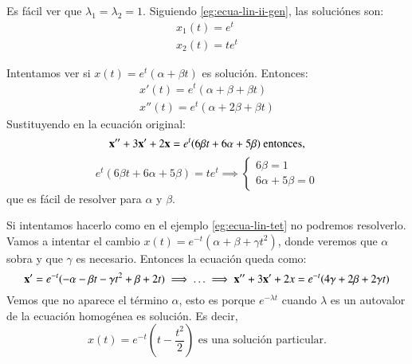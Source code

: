 \begin{eg}[Ecuación lineal de orden 2: $ \mbf{x}'' + 2\mbf{x}' + \mbf{x} = 0 $]
    Es fácil ver que $\lambda_1 = \lambda_2 = 1$. Siguiendo \ref{eg:ecua-lin-ii-gen}, las soluciónes son:
    \begin{gather*}
        x_1(t) = e^{ t} \\ x_2(t) = t e^{t}
    \end{gather*}
\end{eg}

\begin{eg}[Ecuación lineal de orden 2: $\mbf{x}''+3\mbf{x}'+2\mbf{x}=te^t$ ]\label{eg:ecua-lin-tet} %
    Intentamos ver si $x(t) = e^t(\alpha + \beta t)$ es solución. Entonces:
    \begin{gather*}
        x'(t) = e^{ t}(\alpha + \beta + \beta t) \\ x''(t) = e^t (\alpha + 2\beta + \beta t)
    \end{gather*}
    Sustituyendo en la ecuación original:
    $$
        \mathbf{x}''+3\mathbf{x}'+2\mathbf{x} = e^t (6 \beta t + 6 \alpha + 5 \beta) \text{ entonces,}
    $$
    $$
        e^t (6 \beta t + 6 \alpha + 5 \beta) = te^t \implies \begin{cases}
            6\beta = 1\\
            6\alpha + 5\beta = 0
    \end{cases}
    $$ que es fácil de resolver para $\alpha$ y $\beta$.
\end{eg}
\begin{eg}[Ecuación lineal de orden 2: $\mbf{x}''+3\mbf{x}'+2\mbf{x}=te^{-t}$ ]
    Si intentamos hacerlo como en el ejemplo \ref{eg:ecua-lin-tet} no podremos resolverlo.\\ Vamos a intentar el cambio $x(t) = e^{-t} (\alpha + \beta + \gamma t^2)$, donde veremos que $\alpha$ sobra y que $\gamma$ es necesario. Entonces la ecuación queda como:
    $$
        \mathbf{x}' = e^{-t} (-\alpha -\beta t - \gamma t^2 + \beta + 2 t) \implies \ldots \implies \mathbf{x}'' + 3\mathbf{x}' + 2x = e^{-t} (4\gamma + 2\beta + 2\gamma t)
    $$
    Vemos que no aparece el término $\alpha$, esto es porque $e^{-\lambda t}$ cuando $\lambda$ es un autovalor de la ecuación homogénea es solución. Es decir,
    $$
        x(t) = e^{-t}(t-\frac{t^2}{2}) \text{ es una solución particular.}
    $$
\end{eg}
